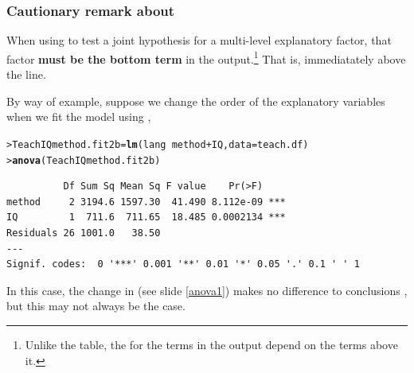 \documentclass{beamer}\usepackage[]{graphicx}\usepackage[]{xcolor}
\makeatletter
\newcommand{\hlopt}[1]{\textcolor[rgb]{0,0,0}{#1}}%
\newcommand{\hlstd}[1]{\textcolor[rgb]{0.345,0.345,0.345}{#1}}%
\newcommand{\hlkwb}[1]{\textcolor[rgb]{0.69,0.353,0.396}{#1}}%
\newcommand{\hlkwc}[1]{\textcolor[rgb]{0.333,0.667,0.333}{#1}}%
\newcommand{\hlkwd}[1]{\textcolor[rgb]{0.737,0.353,0.396}{\textbf{#1}}}%
\newenvironment{kframe}{%
 \def\at@end@of@kframe{}%
 \ifinner\ifhmode%
  \def\at@end@of@kframe{\end{minipage}}%
  \begin{minipage}{\columnwidth}%
 \fi\fi%
 \def\FrameCommand##1{\hskip\@totalleftmargin \hskip-\fboxsep
 \colorbox{shadecolor}{##1}\hskip-\fboxsep
     \hskip-\linewidth \hskip-\@totalleftmargin \hskip\columnwidth}%
 \MakeFramed {\advance\hsize-\width
   \@totalleftmargin\z@ \linewidth\hsize
   \@setminipage}}%
 {\par\unskip\endMakeFramed%
 \at@end@of@kframe}
\newenvironment{knitrout}{}{} %
\makeatother
\begin{document}
\begin{frame}[fragile]
\frametitle{{\bf Cautionary remark} about }
When using  to test a joint hypothesis for a multi-level explanatory factor, that factor {\bf must be the bottom term} in the  output.\footnote{Unlike the  table, the  for the terms in the  output depend on the terms above it. } That is, immediatately above the  line.
\medskip

By way of example, suppose we change the order of the explanatory variables when we fit the model using ,

\begin{knitrout}\scriptsize
{}\color{fgcolor}\begin{kframe}
\begin{alltt}
\hlstd{> }\hlstd{TeachIQmethod.fit2b}\hlkwb{=}\hlkwd{lm}\hlstd{(lang}\hlopt{~}\hlstd{method}\hlopt{+}\hlstd{IQ,} \hlkwc{data}\hlstd{=teach.df)}
\hlstd{> }\hlkwd{anova}\hlstd{(TeachIQmethod.fit2b)}
\end{alltt}
\end{kframe}
\end{knitrout}

\begin{knitrout}\scriptsize
{}\color{fgcolor}\begin{kframe}
\begin{verbatim}
          Df Sum Sq Mean Sq F value    Pr(>F)    
method     2 3194.6 1597.30  41.490 8.112e-09 ***
IQ         1  711.6  711.65  18.485 0.0002134 ***
Residuals 26 1001.0   38.50                      
---
Signif. codes:  0 '***' 0.001 '**' 0.01 '*' 0.05 '.' 0.1 ' ' 1
\end{verbatim}
\end{kframe}
\end{knitrout}

In this case, the change in  (see slide \ref{anova1}) makes no difference to conclusions , but this may not always be the case.
\vfill

\end{frame}
\end{document}
